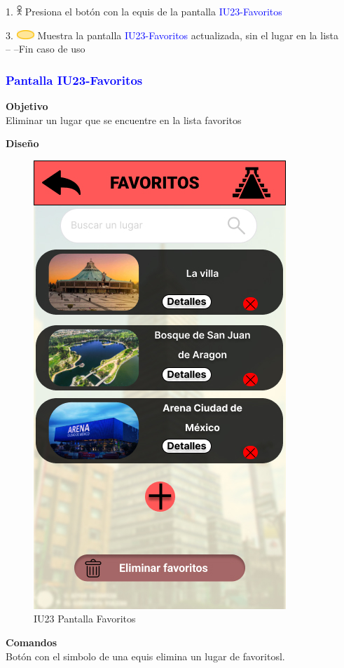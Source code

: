     1. \includegraphics[width=0.0150\textwidth]{Figuras/persona.png} Presiona el botón con la equis de la pantalla \textcolor{blue}{IU23-Favoritos}

    3. \includegraphics[width=0.0500\textwidth]{Figuras/sistema.png} Muestra la pantalla \textcolor{blue}{IU23-Favoritos} actualizada, sin el lugar en la lista\\
    -- --Fin caso de uso\\
    
\subsubsection{\textcolor{blue}{Pantalla IU23-Favoritos}}

\textbf{Objetivo} \\
Eliminar un lugar que se encuentre en la lista favoritos

\textbf{Diseño}

    \begin{figure}[h]
        
            \centering
            \includegraphics[width=.4\linewidth]{Pantallas Prototipo3/IU23 Pantalla Favoritos.jpg}
            \caption{IU23 Pantalla Favoritos}
    
    \end{figure}
\textbf{Comandos} \\
Botón con el simbolo de una equis elimina un lugar de favoritosl.


